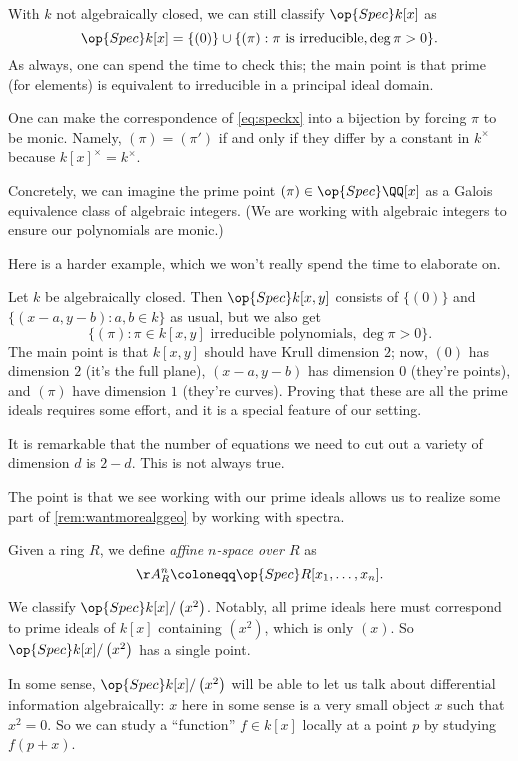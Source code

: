 \documentclass[../notes.tex]{subfiles}
\begin{document}
\begin{example}
	With $k$ not algebraically closed, we can still classify $\op{Spec}k[x]$ as
	\begin{equation}
		\op{Spec}k[x]=\{(0)\}\cup\{(\pi):\pi\text{ is irreducible},\deg\pi>0\}. \label{eq:speckx}
	\end{equation}
	As always, one can spend the time to check this; the main point is that prime (for elements) is equivalent to irreducible in a principal ideal domain.
\end{example}
\begin{remark}
	One can make the correspondence of \autoref{eq:speckx} into a bijection by forcing $\pi$ to be monic. Namely, $(\pi)=(\pi')$ if and only if they differ by a constant in $k^\times$ because $k[x]^\times=k^\times$.
\end{remark}
\begin{example}
	Concretely, we can imagine the prime point $(\pi)\in\op{Spec}\QQ[x]$ as a Galois equivalence class of algebraic integers. (We are working with algebraic integers to ensure our polynomials are monic.)
\end{example}
Here is a harder example, which we won't really spend the time to elaborate on.
\begin{example}
	Let $k$ be algebraically closed. Then $\op{Spec}k[x,y]$ consists of $\{(0)\}$ and $\{(x-a,y-b):a,b\in k\}$ as usual, but we also get
	\[\{(\pi):\pi\in k[x,y]\text{ irreducible polynomials},\deg\pi>0\}.\]
	The main point is that $k[x,y]$ should have Krull dimension $2$; now, $(0)$ has dimension $2$ (it's the full plane), $(x-a,y-b)$ has dimension $0$ (they're points), and $(\pi)$ have dimension $1$ (they're curves). Proving that these are all the prime ideals requires some effort, and it is a special feature of our setting.
\end{example}
\begin{remark}
	It is remarkable that the number of equations we need to cut out a variety of dimension $d$ is $2-d$. This is not always true.
\end{remark}
The point is that we see working with our prime ideals allows us to realize some part of \autoref{rem:wantmorealggeo} by working with spectra.
\begin{definition}
	Given a ring $R$, we define \textit{affine $n$-space over $R$} as
	\[\AA^n_R\coloneqq\op{Spec}R[x_1,\ldots,x_n].\]
\end{definition}
\begin{example}
	We classify $\op{Spec}k[x]/\left(x^2\right)$. Notably, all prime ideals here must correspond to prime ideals of $k[x]$ containing $\left(x^2\right)$, which is only $(x)$. So $\op{Spec}k[x]/\left(x^2\right)$ has a single point.
\end{example}
\begin{remark}
	In some sense, $\op{Spec}k[x]/\left(x^2\right)$ will be able to let us talk about differential information algebraically: $x$ here in some sense is a very small object $x$ such that $x^2=0$. So we can study a ``function'' $f\in k[x]$ locally at a point $p$ by studying $f(p+x)$.
\end{remark}
\end{document}
